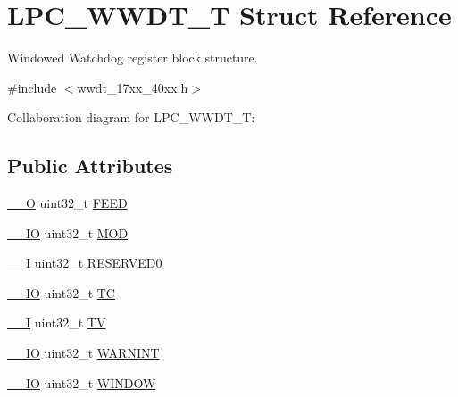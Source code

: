 \hypertarget{structLPC__WWDT__T}{}\section{L\+P\+C\+\_\+\+W\+W\+D\+T\+\_\+T Struct Reference}
\label{structLPC__WWDT__T}


Windowed Watchdog register block structure.  




{\ttfamily \#include $<$wwdt\+\_\+17xx\+\_\+40xx.\+h$>$}



Collaboration diagram for L\+P\+C\+\_\+\+W\+W\+D\+T\+\_\+T\+:
\subsection*{Public Attributes}
\begin{DoxyCompactItemize}
\item 
\hyperlink{core__cm3_8h_a7e25d9380f9ef903923964322e71f2f6}{\+\_\+\+\_\+O} uint32\+\_\+t \hyperlink{structLPC__WWDT__T_a80b357a30f90ba82fd46ff1faa8fe4b8}{F\+E\+ED}
\item 
\hyperlink{core__cm3_8h_aec43007d9998a0a0e01faede4133d6be}{\+\_\+\+\_\+\+IO} uint32\+\_\+t \hyperlink{structLPC__WWDT__T_a92ea6cd2032ed81f7c5f626b48c4c772}{M\+OD}
\item 
\hyperlink{core__cm3_8h_af63697ed9952cc71e1225efe205f6cd3}{\+\_\+\+\_\+I} uint32\+\_\+t \hyperlink{structLPC__WWDT__T_af47cdcbd1ae7b068bf6b66566a140aa6}{R\+E\+S\+E\+R\+V\+E\+D0}
\item 
\hyperlink{core__cm3_8h_aec43007d9998a0a0e01faede4133d6be}{\+\_\+\+\_\+\+IO} uint32\+\_\+t \hyperlink{structLPC__WWDT__T_a8390ac91aea3330b363ad2fd5dc97f98}{TC}
\item 
\hyperlink{core__cm3_8h_af63697ed9952cc71e1225efe205f6cd3}{\+\_\+\+\_\+I} uint32\+\_\+t \hyperlink{structLPC__WWDT__T_a8257032e074282d5242e1d2a07537db1}{TV}
\item 
\hyperlink{core__cm3_8h_aec43007d9998a0a0e01faede4133d6be}{\+\_\+\+\_\+\+IO} uint32\+\_\+t \hyperlink{structLPC__WWDT__T_a6efaed3716fc4661ef3a7a52bcc9028a}{W\+A\+R\+N\+I\+NT}
\item 
\hyperlink{core__cm3_8h_aec43007d9998a0a0e01faede4133d6be}{\+\_\+\+\_\+\+IO} uint32\+\_\+t \hyperlink{structLPC__WWDT__T_abcc1eca1d9cc366b693a5333fb75d1e0}{W\+I\+N\+D\+OW}
\end{DoxyCompactItemize}


